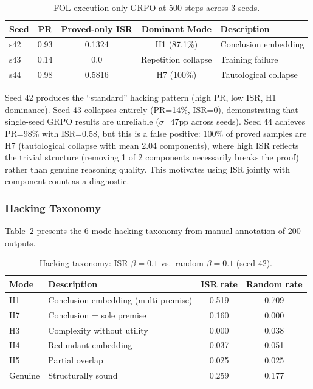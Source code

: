 \documentclass[11pt,a4paper]{article}
\newcommand{\isr}{\textsc{ISR}}
\newcommand{\pr}{\textsc{PR}}
\begin{document}
\begin{table}[h]
\centering
\caption{FOL execution-only GRPO at 500 steps across 3 seeds.}
\label{tab:cross_seed_fol}
\begin{tabular}{lcccl}
\toprule
Seed & PR & Proved-only ISR & Dominant Mode & Description \\
\midrule
s42 & 0.93 & 0.1324 & H1 (87.1\%) & Conclusion embedding \\
s43 & 0.14 & 0.0 & Repetition collapse & Training failure \\
s44 & 0.98 & 0.5816 & H7 (100\%) & Tautological collapse \\
\bottomrule
\end{tabular}
\end{table}

Seed 42 produces the ``standard'' hacking pattern (high \pr{}, low \isr{}, H1 dominance).
Seed 43 collapses entirely (\pr{}=14\%, \isr{}=0), demonstrating that single-seed GRPO results are unreliable ($\sigma$=47pp across seeds).
Seed 44 achieves \pr{}=98\% with \isr{}=0.58, but this is a false positive: 100\% of proved samples are H7 (tautological collapse with mean 2.04 components), where high \isr{} reflects the trivial structure (removing 1 of 2 components necessarily breaks the proof) rather than genuine reasoning quality.
This motivates using \isr{} jointly with component count as a diagnostic.

\subsubsection{Hacking Taxonomy}
\label{sec:taxonomy_results}

Table~\ref{tab:taxonomy} presents the 6-mode hacking taxonomy from manual annotation of 200 outputs.

\begin{table}[h]
\centering
\caption{Hacking taxonomy: ISR $\beta{=}0.1$ vs.\ random $\beta{=}0.1$ (seed 42).}
\label{tab:taxonomy}
\begin{tabular}{llcc}
\toprule
Mode & Description & ISR rate & Random rate \\
\midrule
H1 & Conclusion embedding (multi-premise) & 0.519 & 0.709 \\
H7 & Conclusion = sole premise & 0.160 & 0.000 \\
H3 & Complexity without utility & 0.000 & 0.038 \\
H4 & Redundant embedding & 0.037 & 0.051 \\
H5 & Partial overlap & 0.025 & 0.025 \\
Genuine & Structurally sound & 0.259 & 0.177 \\
\bottomrule
\end{tabular}
\end{table}
\end{document}
